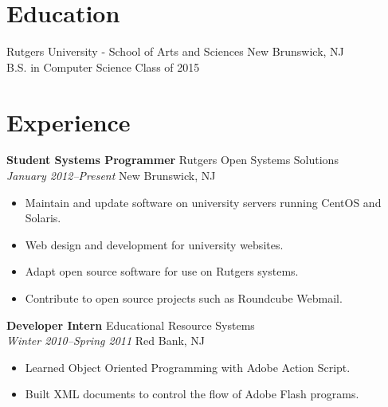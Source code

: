 \documentclass[margin]{res}
\begin{document}

\address{{\bf Present Address } \\ 2112 LPO Way \\ Piscataway, NJ 08854  \\
        phone : (732) 403 4073 }
\address{{\bf Permanent Address} \\ 153 Riveredge Road \\ Tinton Falls, NJ 07724\\
		email : jmatthews492@gmail.com }

\begin{resume}

\section{Education}

Rutgers University - School of Arts and Sciences \hfill New Brunswick, NJ\\
B.S. in Computer Science \hfill Class of 2015

\section{Experience}

{\bf Student Systems Programmer} \hfill Rutgers Open Systems Solutions\\
\textit{January 2012--Present} \hfill New Brunswick, NJ
\begin{itemize} \itemsep -2pt %
	\item Maintain and update software on university servers running CentOS and Solaris.
	\item Web design and development for university websites.
	\item Adapt open source software for use on Rutgers systems.
	\item Contribute to open source projects such as Roundcube Webmail.
\end{itemize}

{\bf Developer Intern} \hfill Educational Resource Systems\\
\textit{Winter 2010--Spring 2011} \hfill  Red Bank, NJ
\begin{itemize} \itemsep -2pt %
	\item Learned Object Oriented Programming with Adobe Action Script.
	\item Built XML documents to control the flow of Adobe Flash programs.
\end{itemize}


\end{resume}
\end{document}
